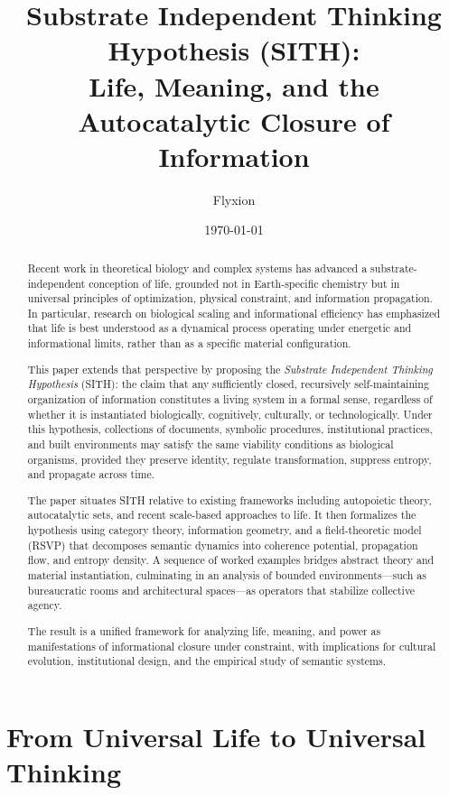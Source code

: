 \documentclass[11pt,oneside]{article}
\title{Substrate Independent Thinking Hypothesis (SITH):\\
Life, Meaning, and the Autocatalytic Closure of Information}
\author{Flyxion}
\date{\today}
\begin{document}
\maketitle

\begin{abstract}
Recent work in theoretical biology and complex systems has advanced a substrate-independent conception of life, grounded not in Earth-specific chemistry but in universal principles of optimization, physical constraint, and information propagation. In particular, research on biological scaling and informational efficiency has emphasized that life is best understood as a dynamical process operating under energetic and informational limits, rather than as a specific material configuration.

This paper extends that perspective by proposing the \emph{Substrate Independent Thinking Hypothesis} (SITH): the claim that any sufficiently closed, recursively self-maintaining organization of information constitutes a living system in a formal sense, regardless of whether it is instantiated biologically, cognitively, culturally, or technologically. Under this hypothesis, collections of documents, symbolic procedures, institutional practices, and built environments may satisfy the same viability conditions as biological organisms, provided they preserve identity, regulate transformation, suppress entropy, and propagate across time.

The paper situates SITH relative to existing frameworks including autopoietic theory, autocatalytic sets, and recent scale-based approaches to life. It then formalizes the hypothesis using category theory, information geometry, and a field-theoretic model (RSVP) that decomposes semantic dynamics into coherence potential, propagation flow, and entropy density. A sequence of worked examples bridges abstract theory and material instantiation, culminating in an analysis of bounded environments—such as bureaucratic rooms and architectural spaces—as operators that stabilize collective agency.

The result is a unified framework for analyzing life, meaning, and power as manifestations of informational closure under constraint, with implications for cultural evolution, institutional design, and the empirical study of semantic systems.
\end{abstract}

\section{From Universal Life to Universal Thinking}
\end{document}
